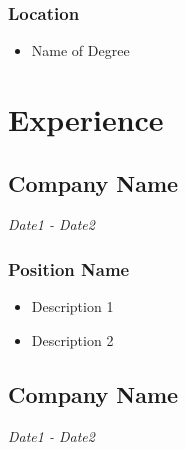\documentclass{article}
\renewcommand{\date}[1]{
    \hfill{\normalsize\textit{#1}}
}
\begin{document}
            \subsubsection{Location}
                \begin{itemize}
                    \item Name of Degree
                \end{itemize}
    \section{Experience}
        \subsection{Company Name}\date{Date1 - Date2} %
            \subsubsection{Position Name}
                \begin{itemize}
                    \item Description 1
                    \item Description 2
                \end{itemize}
        \subsection{Company Name}\date{Date1 - Date2} %
\end{document}
